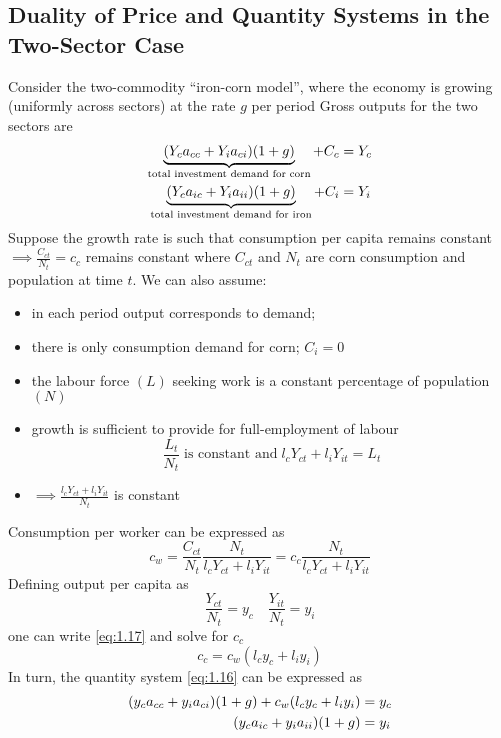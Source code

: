 \documentclass{article}
\begin{document}
\subsection{Duality of Price and Quantity Systems in the Two-Sector Case}
	Consider the two-commodity ``iron-corn model'', where the economy is growing (uniformly across sectors) at the rate \( g \) per period
	Gross outputs for the two sectors are
	\begin{align}
		\underbrace{(Y_c a_{cc} + Y_i a_{ci})(1+g)}_{\text{total investment demand for corn}} + C_c &= Y_c \notag\\
		\underbrace{(Y_c a_{ic} + Y_i a_{ii})(1+g)}_{\text{total investment demand for iron}} + C_i &= Y_i \label{eq:1.16}
	\end{align}
	Suppose the growth rate is such that consumption per capita remains constant \( \implies \frac{C_{ct}}{N_t} = c_c \) remains constant where \( C_{ct} \) and \( N_t \) are corn consumption and population at time \( t \). We can also assume:
	\begin{itemize}
		\item in each period output corresponds to demand;
		\item there is only consumption demand for corn; \( C_i = 0 \)
		\item the labour force \( (L) \)  seeking work is a constant percentage of population \( (N) \)
		\item growth is sufficient to provide for full-employment of labour
		\[
			\frac{L_t}{N_t} \;\text{is constant and}\; l_c Y_{ct} + l_i Y_{it} = L_t
		\]
		\item \( \implies \frac{l_c Y_{ct} + l_i Y_{it}}{N_t} \) is constant
	\end{itemize}
	Consumption per worker can be expressed as
	\begin{equation}
		c_w = \frac{C_{ct}}{N_t}\frac{N_t}{l_c Y_{ct} + l_i Y_{it}} = c_c \frac{N_t}{l_c Y_{ct} + l_i Y_{it}} \label{eq:1.17}
	\end{equation}
	Defining output per capita as
	\[
		\frac{Y_{ct}}{N_t} = y_c \quad \frac{Y_{it}}{N_t} = y_i
	\]
	one can write \cref{eq:1.17} and solve for \( c_c \)
	\begin{equation}
		c_c = c_w(l_c y_c + l_i y_i) \label{eq:1.18}
	\end{equation}
	In turn, the quantity system \cref{eq:1.16} can be expressed as 
	\begin{align}
		(y_c a_{cc} + y_i a_{ci})(1+g) + c_w (l_c y_c + l_i y_i) &= y_c \notag \\
		(y_c a_{ic} + y_i a_{ii})(1+g) &= y_i \label{eq:1.19}
	\end{align}
\end{document}
